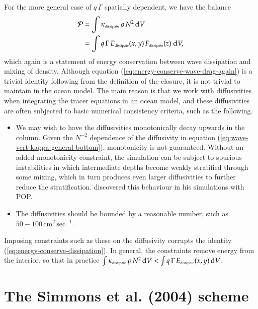 For the more general case of $q \, \Gamma$ spatially dependent, we
have the balance
\begin{equation}
\begin{split}
 {\cal P} &=  \int \kappa_{\mbox{\tiny dissipate}}  \, \rho \, N^{2} \, \mathrm{d}V
 \\
 &= \int q \, \Gamma \,  E_{\mbox{\tiny dissipate}}(x,y) \, F_{\mbox{\tiny dissipate}}(z) \; \mathrm{d}V,
\end{split}
\label{eq:energy-conserve-wave-drag-again}
\end{equation}
which again is a statement of energy conservation between wave
dissipation and mixing of density.  Although equation
(\ref{eq:energy-conserve-wave-drag-again}) is a trivial identity
following from the definition of the closure, it is not trivial to
maintain in the ocean model.  The main reason is that we work with
diffusivities when integrating the tracer equations in an ocean model,
and these diffusivities are often subjected to basic numerical
consistency criteria, such as the following.
\begin{itemize}

\item We may wish to have the diffusivities monotonically decay
  upwards in the column.  Given the $N^{-2}$ dependence of the
  diffusivity in equation (\ref{eq:wave-vert-kappa-general-bottom}),
  monotonicity is not guaranteed.  Without an added monotonicity
  constraint, the simulation can be subject to spurious instabilities
  in which intermediate depths become weakly stratified through some
  mixing, which in turn produces even larger diffusivities to further
  reduce the stratification.  \cite{Jayne2009} discovered this
  behaviour in his simulations with POP.

\item The diffusivities should be bounded by a reasonable number, such
  as $50-100 \, \mbox{cm}^{2} \, \mbox{sec}^{-1}$.
\end{itemize}
Imposing constraints such as these on the diffusivity corrupts the
identity (\ref{eq:energy-conserve-dissipation}).  In general, the
constraints remove energy from the interior, so that in practice $\int
\kappa_{\mbox{\tiny dissipate}} \, \rho \, N^{2} \, \mathrm{d}V < \int
q \, \Gamma \, E_{\mbox{\tiny dissipate}}(x,y) \, \mathrm{d}V$.


\section{The Simmons et al. (2004) scheme}
\label{section:simmons-etal}

